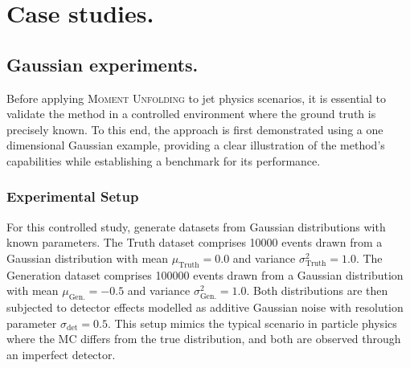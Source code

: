 \section{Case studies.}
\label{sec:moment-unfolding.case-studies}
\sectionminitoc
    \subsection{Gaussian experiments.}
        Before applying \textsc{Moment Unfolding} to jet physics scenarios, it is essential to validate the method in a controlled environment where the ground truth is precisely known.
        To this end, the approach is first demonstrated using a one dimensional Gaussian example, providing a clear illustration of the method's capabilities while establishing a benchmark for its performance.
        \subsubsection{Experimental Setup}
            For this controlled study, generate datasets from Gaussian distributions with known parameters.
            The Truth dataset comprises \num{10000} events drawn from a Gaussian distribution with mean \(\mu_{\textrm{Truth}} = 0.0\) and variance \(\sigma^2_{\textrm{Truth}} = 1.0\).
            The Generation dataset comprises \num{100000} events drawn from a Gaussian distribution with mean $\mu_{\textrm{Gen.}} = -0.5$ and variance $\sigma^2_{\textrm{Gen.}} = 1.0$.
            Both distributions are then subjected to detector effects modelled as additive Gaussian noise with resolution parameter $\sigma_{\textrm{det}} = 0.5$.
            This setup mimics the typical scenario in particle physics where the MC differs from the true distribution, and both are observed through an imperfect detector.

